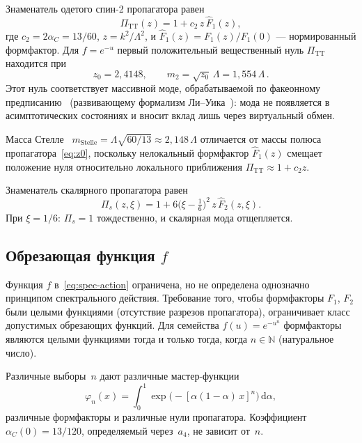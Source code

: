\documentclass[12pt,a4paper]{article}
\theoremstyle{plain}
\theoremstyle{definition}
\theoremstyle{remark}
\newcommand{\dd}{\mathrm{d}}
\begin{document}
Знаменатель одетого спин-2 пропагатора
равен~\cite{Alfyorov:2026paper1}
\begin{equation}\label{eq:PiTT}
  \Pi_{\mathrm{TT}}(z) = 1 + c_2\, z\, \hat{F}_1(z),
\end{equation}
где $c_2 = 2\alpha_C = 13/60$, $z = k^2/\Lambda^2$, и
$\hat{F}_1(z) = F_1(z)/F_1(0)$ --- нормированный формфактор.
Для $f = e^{-u}$ первый положительный вещественный нуль
$\Pi_{\mathrm{TT}}$ находится при
\begin{equation}\label{eq:z0}
  z_0 = 2{,}4148,\qquad
  m_2 = \sqrt{z_0}\,\Lambda = 1{,}554\,\Lambda\,.
\end{equation}
Этот нуль соответствует массивной моде, обрабатываемой по
факеонному предписанию~\cite{Anselmi:2017,Anselmi:2018}
(развивающему формализм Ли--Уика~\cite{LeeWick:1969}): мода
не появляется в асимптотических состояниях и вносит вклад лишь
через виртуальный обмен.

Масса Стелле~\cite{Stelle:1977}
$m_{\mathrm{Stelle}} = \Lambda\sqrt{60/13} \approx 2{,}148\,\Lambda$
отличается от массы полюса пропагатора~\eqref{eq:z0}, поскольку
нелокальный формфактор $\hat{F}_1(z)$ смещает положение нуля
относительно локального приближения
$\Pi_{\mathrm{TT}} \approx 1 + c_2 z$.

Знаменатель скалярного пропагатора равен
\begin{equation}\label{eq:Pis}
  \Pi_s(z, \xi) = 1 + 6\bigl(\xi - \tfrac{1}{6}\bigr)^2\,
  z\, \hat{F}_2(z, \xi).
\end{equation}
При $\xi = 1/6$: $\Pi_s = 1$ тождественно, и скалярная мода
отщепляется.

\subsection{Обрезающая функция $f$}
\label{sec:cutoff}

Функция $f$ в~\eqref{eq:spec-action} ограничена, но не определена
однозначно принципом спектрального действия. Требование того, чтобы формфакторы $F_1$, $F_2$ были целыми
функциями (отсутствие разрезов пропагатора), ограничивает класс
допустимых обрезающих функций.
Для семейства $f(u) = e^{-u^n}$ формфакторы являются целыми
функциями тогда и только тогда, когда $n \in \mathbb{N}$
(натуральное число).

Различные выборы~$n$ дают различные мастер-функции
\begin{equation}\label{eq:phi-n}
  \varphi_n(x) = \int_0^1
  \exp\bigl(-[\alpha(1-\alpha)\, x]^n\bigr)\, \dd\alpha,
\end{equation}
различные формфакторы и различные нули пропагатора. Коэффициент $\alpha_C(0) = 13/120$, определяемый через~$a_4$,
не зависит от~$n$.
\end{document}

